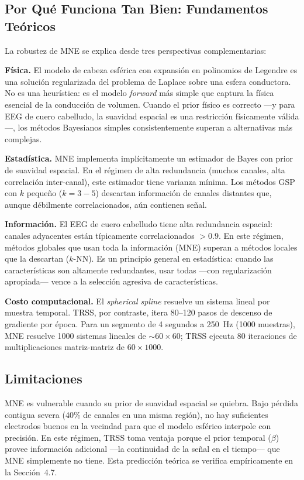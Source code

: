 \subsection{Por Qué Funciona Tan Bien: Fundamentos Teóricos}

La robustez de MNE se explica desde tres perspectivas complementarias:

\textbf{Física.} El modelo de cabeza esférica con expansión en polinomios de Legendre es una solución regularizada del problema de Laplace sobre una esfera conductora. No es una heurística: es el modelo \textit{forward} más simple que captura la física esencial de la conducción de volumen. Cuando el prior físico es correcto —y para EEG de cuero cabelludo, la suavidad espacial es una restricción físicamente válida—, los métodos Bayesianos simples consistentemente superan a alternativas más complejas.

\textbf{Estadística.} MNE implementa implícitamente un estimador de Bayes con prior de suavidad espacial. En el régimen de alta redundancia (muchos canales, alta correlación inter-canal), este estimador tiene varianza mínima. Los métodos GSP con $k$ pequeño ($k = 3{-}5$) descartan información de canales distantes que, aunque débilmente correlacionados, aún contienen señal.

\textbf{Información.} El EEG de cuero cabelludo tiene alta redundancia espacial: canales adyacentes están típicamente correlacionados $> 0.9$. En este régimen, métodos globales que usan toda la información (MNE) superan a métodos locales que la descartan ($k$-NN). Es un principio general en estadística: cuando las características son altamente redundantes, usar todas —con regularización apropiada— vence a la selección agresiva de características.

\textbf{Costo computacional.} El \textit{spherical spline} resuelve un sistema lineal por muestra temporal. TRSS, por contraste, itera 80--120 pasos de descenso de gradiente por época. Para un segmento de 4 segundos a 250~Hz (1000 muestras), MNE resuelve 1000 sistemas lineales de $\sim 60 \times 60$; TRSS ejecuta 80 iteraciones de multiplicaciones matriz-matriz de $60 \times 1000$.

\subsection{Limitaciones}

MNE es vulnerable cuando su prior de suavidad espacial se quiebra. Bajo pérdida contigua severa (40\% de canales en una misma región), no hay suficientes electrodos buenos en la vecindad para que el modelo esférico interpole con precisión. En este régimen, TRSS toma ventaja porque el prior temporal ($\beta$) provee información adicional —la continuidad de la señal en el tiempo— que MNE simplemente no tiene. Esta predicción teórica se verifica empíricamente en la Sección~4.7.

